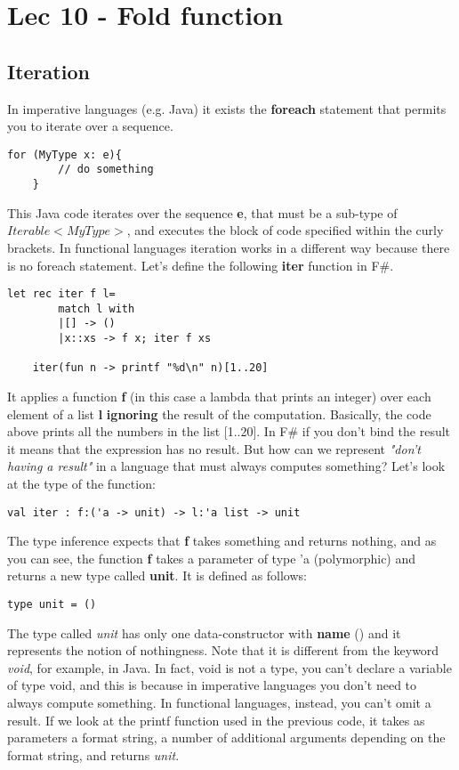 \chapter{Lec 10 - Fold function}
\section{Iteration}
In imperative languages (e.g. Java) it exists the \textbf{foreach} statement that permits you to iterate over a sequence.
\begin{lstlisting}[style = JavaStyle]
    for (MyType x: e){
        // do something
    }
\end{lstlisting}
This Java code iterates over the sequence \textbf{e}, that must be a sub-type of \colorbox{mygray}{$Iterable<MyType>$}, and executes the block of code specified within the curly brackets.\newline\newline
In functional languages iteration works in a different way because there is no foreach statement. Let's define the following \textbf{iter} function in F\#.
\begin{lstlisting}[style = FSharpStyle]
    let rec iter f l=
        match l with
        |[] -> ()
        |x::xs -> f x; iter f xs
        
    iter(fun n -> printf "%d\n" n)[1..20]   
\end{lstlisting}
It applies a function \textbf{f} (in this case a lambda that prints an integer) over each element of a list \textbf{l} \textbf{ignoring} the result of the computation. Basically, the code above prints all the numbers in the list [1..20].\newline\newline
In F\# if you don't bind the result it means that the expression has no result. But how can we represent \textit{"don't having a result"} in a language that must always computes something? Let's look at the type of the function:
\begin{lstlisting}[style = FSharpStyle]
    val iter : f:('a -> unit) -> l:'a list -> unit
\end{lstlisting}
The type inference expects that \textbf{f} takes something and returns nothing, and as you can see, the function \textbf{f} takes a parameter of type 'a (polymorphic) and returns a new type called \textbf{unit}. It is defined as follows:
\begin{lstlisting}[style = FSharpStyle]
    type unit = ()
\end{lstlisting}
The type called \textit{unit} has only one data-constructor with \textbf{name} () and it represents the notion of nothingness. Note that it is different from the keyword \textit{void}, for example, in Java. In fact, void is not a type, you can’t declare a variable of type void, and this is because in imperative languages you don't need to always compute something. In functional languages, instead, you can't omit a result. If we look at the printf function used in the previous code, it takes as parameters a format string, a number of additional arguments depending on the format string, and returns \textit{unit}.\newline\newline
